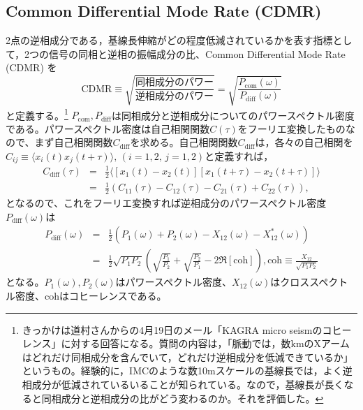\subsection{Common Differential Mode Rate (CDMR)}
2点の逆相成分である，基線長伸縮がどの程度低減されているかを表す指標として，2つの信号の同相と逆相の振幅成分の比、Common Differential Mode Rate (CDMR) を
\begin{equation}
  \boxed{\mathrm{CDMR} \equiv \sqrt{\frac{同相成分のパワー}{逆相成分のパワー}} = \sqrt{\frac{P_{\mathrm{com}}(\omega)}{P_{\mathrm{diff}}(\omega)}}} \label{eq:eq23}
\end{equation}
と定義する。\footnote[0]{きっかけは道村さんからの4月19日のメール「KAGRA micro seismのコヒーレンス」に対する回答になる。質問の内容は，「脈動では，数kmのXアームはどれだけ同相成分を含んでいて，どれだけ逆相成分を低減できているか」というもの。経験的に，IMCのような数10mスケールの基線長では，よく逆相成分が低減されているいることが知られている。なので，基線長が長くなると同相成分と逆相成分の比がどう変わるのか。それを評価した。}
$P_{\mathrm{com}},P_{\mathrm{diff}}$は同相成分と逆相成分についてのパワースペクトル密度である。パワースペクトル密度は自己相関関数$C(\tau)$をフーリエ変換したものなので、まず自己相関関数$C_{\mathrm{diff}}$を求める。自己相関関数$C_{\mathrm{diff}}$は，各々の自己相関を$ C_{ij} \equiv \langle x_{i}(t)x_{j}(t+\tau)\rangle,\, (i=1,2,\,j=1,2)$と定義すれば， 
\begin{eqnarray}
  C_{\mathrm{diff}}(\tau) &=& \frac{1}{2}
  \langle
  \left[ x_{1}(t)-x_{2}(t) \right]   \left[ x_{1}(t+\tau)-x_{2}(t+\tau) \right]
  \rangle \\
  &=& \frac{1}{2}\left( C_{11}(\tau) - C_{12}(\tau) - C_{21}(\tau) + C_{22}(\tau) \right), 
\end{eqnarray}
となるので、これをフーリエ変換すれば逆相成分のパワースペクトル密度$P_{\mathrm{diff}}(\omega)$は
\begin{eqnarray}
  P_{\mathrm{diff}}(\omega) &=& \frac{1}{2}\left( P_{1}(\omega) + P_{2}(\omega) - X_{12}(\omega) - X_{12}^*(\omega) \right)\\
  &=& \frac{1}{2} \sqrt{P_{1}P_{2}} \left( \sqrt{\frac{P_{1}}{P_{2}}}+ \sqrt{\frac{P_{2}}{P_{1}}} - 2\Re \left[\mathrm{coh} \right] \right) , 
\mathrm{coh} \equiv \frac{X_{12}}{\sqrt{P_{1}P_{2}}} \label{eq:eq31}
\end{eqnarray}
となる。$P_{1}(\omega),P_{2}(\omega)$はパワースペクトル密度、$X_{12}(\omega)$はクロススペクトル密度、$\mathrm{coh}$はコヒーレンスである。


